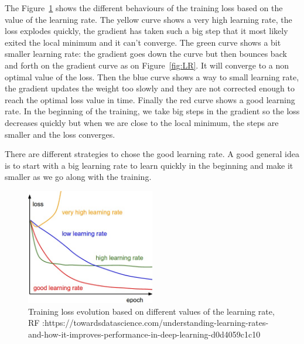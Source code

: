 The Figure~\ref{fig:LR_impact} shows the different behaviours of the training loss based on the value of the learning rate. The yellow curve shows a very high learning rate, the loss explodes quickly, the gradient has taken such a big step that it most likely exited the local minimum and it can't converge. The green curve shows a bit smaller learning rate: the gradient goes down the curve but then bounces back and forth on the gradient curve as on Figure~\ref{fig:LR}. It will converge to a non optimal value of the loss. Then the blue curve shows a way to small learning rate, the gradient updates the weight too slowly and they are not corrected enough to reach the optimal loss value in time. Finally the red curve shows a good learning rate. In the beginning of the training, we take big steps in the gradient so the loss decreases quickly but when we are close to the local minimum, the steps are smaller and the loss converges. 


There are different strategies to chose the good learning rate. A good general idea is to start with a big learning rate to learn quickly in the beginning and make it smaller as we go along with the training. 
\begin{figure}[!htp]
    \centering
        \includegraphics[width=0.5\textwidth]{./figures/02-LR_impatc_train}
        \caption{Training loss evolution based on different values of the learning rate, RF :https://towardsdatascience.com/understanding-learning-rates-and-how-it-improves-performance-in-deep-learning-d0d4059c1c10}\label{fig:LR_impact}
\end{figure}

